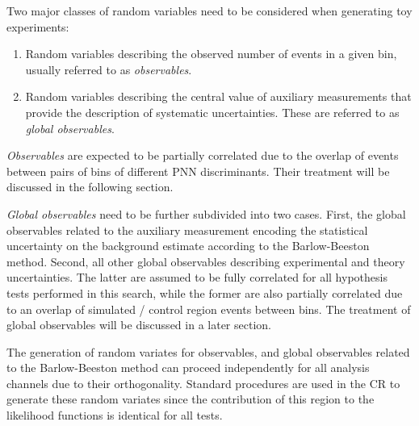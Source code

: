 \vspace{10em}









Two major classes of random variables need to be considered when generating toy
experiments:
\begin{enumerate}
\item Random variables describing the observed number of events in a given bin,
  usually referred to as \emph{observables}.

\item Random variables describing the central value of auxiliary measurements
  that provide the description of systematic uncertainties. These are referred
  to as \emph{global observables}.
\end{enumerate}

\emph{Observables} are expected to be partially correlated due to the overlap of
events between pairs of bins of different PNN discriminants. Their treatment
will be discussed in the following section.

\emph{Global observables} need to be further subdivided into two cases. First,
the global observables related to the auxiliary measurement encoding the
statistical uncertainty on the background
estimate %
according to the Barlow-Beeston method. Second, all other global observables
describing experimental and theory uncertainties. The latter are assumed to be
fully correlated for all hypothesis tests performed in this search, while the
former are also partially correlated due to an overlap of simulated / control
region events between bins. The treatment of global observables will be
discussed in a later section.

The generation of random variates for observables, and global observables
related to the Barlow-Beeston method can proceed independently for all analysis
channels due to their orthogonality. Standard procedures are used in the CR to
generate these random variates since the contribution of this region to the
likelihood functions is identical for all tests.


%
%
%

